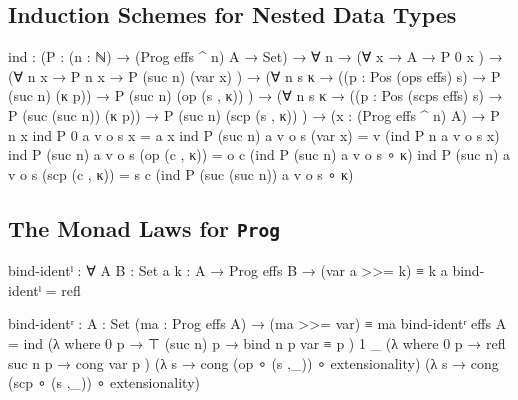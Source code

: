 \subsection{Induction Schemes for Nested Data Types}

\begin{code}
ind : (P : (n : ℕ) → (Prog effs ^ n) A → Set) → ∀ n →
  (∀ {x}        → A                                                    → P 0 x                     )  →
  (∀ {n x}      → P n x                                                → P (suc n) (var x)         )  →
  (∀ {n} s {κ}  → ((p : Pos (ops   effs) s) → P (suc n)        (κ p))  → P (suc n) (op   (s , κ))  )  →
  (∀ {n} s {κ}  → ((p : Pos (scps  effs) s) → P (suc (suc n))  (κ p))  → P (suc n) (scp  (s , κ))  )  →
  (x : (Prog effs ^ n) A) → P n x
ind P 0       a v o s x               = a x
ind P (suc n) a v o s (var x)         = v    (ind P n              a v o s x)
ind P (suc n) a v o s (op   (c , κ))  = o c  (ind P (suc n)        a v o s ∘ κ)
ind P (suc n) a v o s (scp  (c , κ))  = s c  (ind P (suc (suc n))  a v o s ∘ κ)
\end{code}


\subsection{The Monad Laws for \texttt{Prog}}

\begin{code}
bind-identˡ : ∀ {A B : Set} {a} {k : A → Prog effs B} →
  (var a >>= k) ≡ k a
bind-identˡ = refl

bind-identʳ : {A : Set} (ma : Prog effs A) →
  (ma >>= var) ≡ ma
bind-identʳ {effs} {A} = ind (λ where
    0        p → ⊤
    (suc n)  p → bind n p var ≡ p
  ) 1 _ (λ where
    {0}      p → refl
    {suc n}  p → cong var p
  )
  (λ s → cong (op   ∘ (s ,_)) ∘ extensionality)
  (λ s → cong (scp  ∘ (s ,_)) ∘ extensionality)
\end{code}
